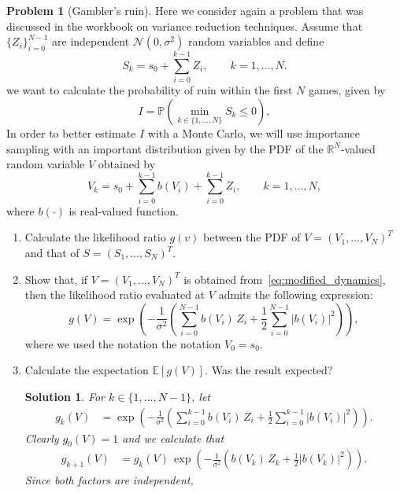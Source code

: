 \documentclass[11pt,a4paper]{article}
\theoremstyle{definition}
\newtheorem{problem}{Problem}
\theoremstyle{plain}
\newtheorem*{solution}{Solution}
\begin{document}
\begin{problem}
    [Gambler's ruin]
    Here we consider again a problem that was discussed in the workbook on variance reduction techniques.
    Assume that $\{Z_i\}_{i=0}^{N-1}$ are independent $\mathcal N(0, \sigma^2)$ random variables and
    define
    \[
        S_k = s_0 + \sum_{i=0}^{k-1} Z_i, \qquad k = 1, \dotsc, N.
    \]
    we want to calculate the probability of ruin within the first $N$ games, given by
    $$
    I = \mathbb P \left(\min_{k \in \{1, \dotsc, N\}} S_k \leq 0 \right),
    $$
    In order to better estimate $I$ with a Monte Carlo,
    we will use importance sampling with an important distribution given by the PDF of the $\mathbb R^N$-valued random variable $V$
    obtained by
    \begin{equation}
        \label{eq:modified_dynamics}%
        V_k = s_0 + \sum_{i=0}^{k-1} b(V_{i}) + \sum_{i=0}^{k-1} Z_i, \qquad k = 1, \dotsc, N,
    \end{equation}
    where $b(\cdot)$ is real-valued function.
    \begin{enumerate}
        \item Calculate the likelihood ratio $g(v)$ between the PDF of $V = (V_1, \dotsc, V_N)^T$ and that of $S = (S_1, \dotsc, S_N)^T$.
        \item Show that, if $V = (V_1, \dotsc, V_N)^T$ is obtained from~\eqref{eq:modified_dynamics},
            then the likelihood ratio evaluated at $V$ admits the following expression:
            \[
                g(V) = \exp \left( - \frac{1}{\sigma^2} \left( \sum_{i=0}^{N-1} b(V_i) \, Z_i + \frac{1}{2} \sum_{i=0}^{N-1} |b(V_i)|^2 \right) \right),
            \]
            where we used the notation the notation $V_0 = s_0$.
        \item Calculate the expectation $\mathbb E[g(V)]$. Was the result expected?
\begin{solution}
For $k \in \{1, \dotsc, N - 1\}$, let
\begin{align*}
    g_{k}(V) &= \exp \left( - \frac{1}{\sigma^2} \left( \sum_{i=0}^{k-1} b(V_i) \, Z_i + \frac{1}{2} \sum_{i=0}^{k-1} |b(V_i)|^2 \right) \right).
\end{align*}
Clearly $g_0(V) = 1$ and we calculate that
\begin{align*}
    g_{k+1}(V) &= g_{k}(V) \, \exp \left( - \frac{1}{\sigma^2} \left( b(V_{k}) \, Z_{k} + \frac{1}{2} |b(V_{k})|^2 \right) \right).
\end{align*}
Since both factors are independent,
\begin{align*}

\end{align*}
\end{solution}
\end{enumerate}
\end{problem}
\end{document}
